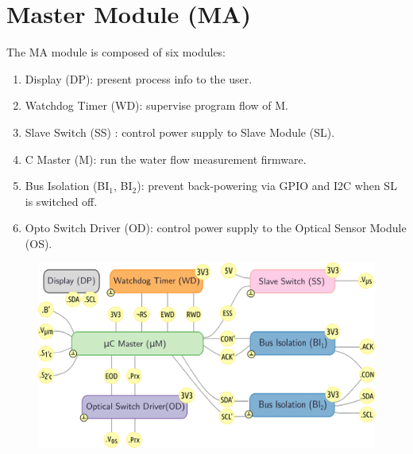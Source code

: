\section{Master Module (MA)}

The MA module is composed of six modules:

\begin{enumerate}
    \item Display (DP): present process info to the user.
    \item Watchdog Timer (WD): supervise program flow of \mu M.
    \item Slave Switch (SS) : control power supply to Slave Module (SL).
    \item \mu C Master (\mu M): run the water flow measurement firmware.
    \item Bus Isolation (BI$_1$, BI$_2$): prevent back-powering via GPIO and I2C when SL is switched off.
    \item Opto Switch Driver (OD): control power supply to the Optical Sensor Module (OS).
\end{enumerate}


\begin{figure}[h]
    \centering
    \includegraphics[width=1.0\textwidth]{MA/MA}
\end{figure}



\clearpage











